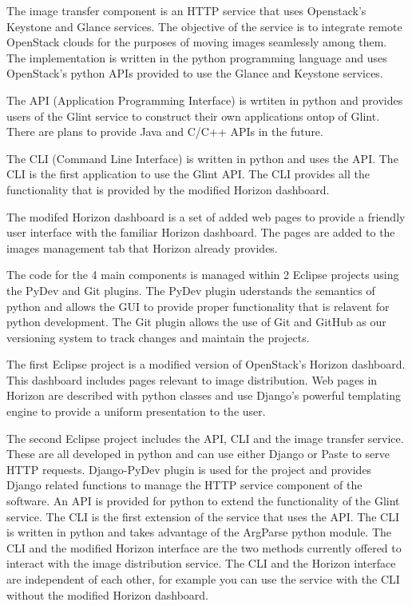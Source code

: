 \documentclass[a4paper]{jpconf}
\begin{document}
The image transfer component is an HTTP service that uses Openstack's Keystone and Glance services. The objective of the service is to integrate remote OpenStack clouds for the purposes of moving images seamlessly among them. The implementation is written in the python programming language and uses OpenStack's python APIs provided to use the Glance and Keystone services.

The API (Application Programming Interface) is wrtiten in python and provides users of the Glint service to construct their own applications ontop of Glint. There are plans to provide Java and C/C++ APIs in the future.

The CLI (Command Line Interface) is written in python and uses the API. The CLI is the first application to use the Glint API. The CLI provides all the functionality that is provided by the modified Horizon dashboard.

The modifed Horizon dashboard is a set of added web pages to provide a friendly user interface with the familiar Horizon dashboard. The pages are added to the images management tab that Horizon already provides. 

The code for the 4 main components is managed within 2 Eclipse projects using the PyDev and Git plugins. The PyDev plugin uderstands the semantics of python and allows the GUI to provide proper functionality that is relavent for python development. The Git plugin allows the use of Git and GitHub as our versioning system to track changes and maintain the projects. 

The first Eclipse project is a modified version of OpenStack's Horizon dashboard. This dashboard includes pages relevant to image distribution. Web pages in Horizon are described with python classes and use Django's powerful templating engine to provide a uniform presentation to the user. 

The second Eclipse project includes the API, CLI and the image transfer service. These are all developed in python and can use either Django or Paste to serve HTTP requests. Django-PyDev plugin is used for the project and provides Django related functions to manage the HTTP service component of the software. An API is provided for python to extend the functionality of the Glint service. The CLI is the first extension of the service that uses the API. The CLI is written in python and takes advantage of the ArgParse python module. The CLI and the modified Horizon interface are the two methods currently offered to interact with the image distribution service. The CLI and the Horizon interface are independent of each other, for example you can use the service with the CLI without the modified Horizon dashboard.
\end{document}
